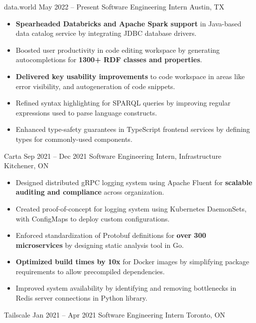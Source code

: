 \documentclass{article}
\begin{document}
\WorkEntry
  {data.world}
  {May 2022 -- Present}
  {Software Engineering Intern \hfill Austin, TX}
  {
    \begin{itemize} \itemsep -1pt
      \item \textbf{Spearheaded Databricks and Apache Spark support} in Java-based data catalog service by integrating JDBC database drivers.
      \item Boosted user productivity in code editing workspace by generating autocompletions for \textbf{1300+ RDF classes and properties}.
      \item \textbf{Delivered key usability improvements} to code workspace in areas like error visibility, and autogeneration of code snippets.
      \item Refined syntax highlighting for SPARQL queries by improving regular expressions used to parse language constructs.
      \item Enhanced type-safety guarantees in TypeScript frontend services by defining types for commonly-used components.
    \end{itemize}
  }
\WorkEntry
  {Carta}
  {Sep 2021 -- Dec 2021}
  {Software Engineering Intern, Infrastructure \hfill Kitchener, ON}
  {
    \begin{itemize} \itemsep -1pt
      \item Designed distributed gRPC logging system using Apache Fluent for \textbf{scalable auditing and compliance} across organization.
      \item Created proof-of-concept for logging system using Kubernetes DaemonSets, with ConfigMaps to deploy custom configurations.
      \item Enforced standardization of Protobuf definitions for \textbf{over 300 microservices} by designing static analysis tool in Go.
      \item \textbf{Optimized build times by 10x} for Docker images by simplifying package requirements to allow precompiled dependencies.
      \item Improved system availability by identifying and removing bottlenecks in Redis server connections in Python library.
    \end{itemize}
  }
\WorkEntry
  {Tailscale}
  {Jan 2021 -- Apr 2021}
  {Software Engineering Intern \hfill Toronto, ON}
\end{document}
